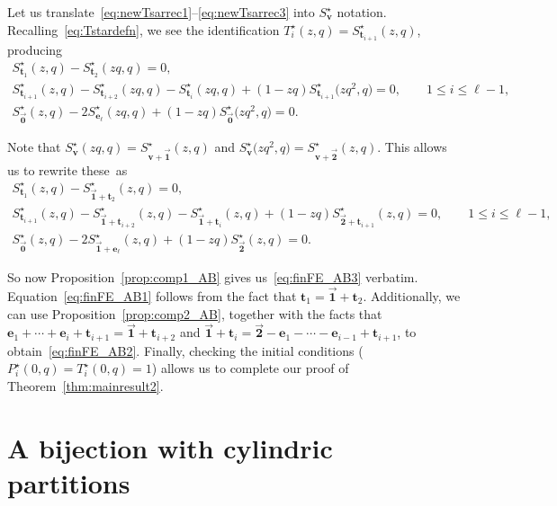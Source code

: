 \documentclass[pdftex]{sigma}
\numberwithin{equation}{section}
\theoremstyle{definition}
\newcommand{\tr}{\mathbf{t}}
\newcommand{\vv}{\mathbf{v}}
\newcommand{\ee}{\mathbf{e}}
\newcommand{\two}{\vec{\mathbf{2}}}
\newcommand{\one}{\vec{\mathbf{1}}}
\newcommand{\zero}{\vec{\mathbf{0}}}
\begin{document}
Let us translate~\eqref{eq:newTsarrec1}--\eqref{eq:newTsarrec3} into $S^\star_\vv$ notation. Recalling~\eqref{eq:Tstardefn}, we see the identification $T^\star_i(z,q) = S^\star_{\tr_{i+1}}(z,q)$, producing
\begin{gather*}
S^\star_{\tr_1}(z,q)-S^\star_{\tr_2}(zq,q) =0, \\
S^\star_{\tr_{i+1}}(z,q) - S^\star_{\tr_{i+2}}(zq,q) - S^\star_{\tr_{i}}(zq,q) + (1-zq)S^\star_{\tr_{i+1}}\bigl(zq^2,q\bigr) =0, \qquad 1 \le i \le \ell-1, \\
S^\star_{\zero}(z,q) -2S^\star_{\ee_\ell}(zq,q) + (1-zq) S^\star_{\zero}\bigl(zq^2,q\bigr) = 0.
\end{gather*}

Note that $S^\star_\vv(zq,q) = S^\star_{\vv+\one} (z,q)$ and $S^\star_\vv\bigl(zq^2,q\bigr) = S^\star_{\vv+\two} (z,q)$. This allows us to rewrite these~as
\begin{gather}
S^\star_{\tr_1}(z,q)-S^\star_{\one+\tr_2}(z,q) =0,\label{eq:finFE_AB1} \\
S^\star_{\tr_{i+1}}(z,q) - S^\star_{\one+\tr_{i+2}}(z,q) - S^\star_{\one+\tr_{i}}(z,q) + (1-zq)S^\star_{\two+\tr_{i+1}}(z,q) =0, \qquad\! 1 \le i \le \ell-1, \!\!\!\label{eq:finFE_AB2} \\
S^\star_{\zero}(z,q) - 2S^\star_{\one+\ee_\ell}(z,q) + (1-zq) S^\star_{\two}(z,q) = 0. \label{eq:finFE_AB3}
\end{gather}

So now Proposition~\ref{prop:comp1_AB} gives us~\eqref{eq:finFE_AB3} verbatim. Equation~\eqref{eq:finFE_AB1} follows from the fact that $\tr_1=\one+\tr_2$. Additionally, we can use Proposition~\ref{prop:comp2_AB}, together with the facts that $\ee_1+\cdots+\ee_{i}+\tr_{i+1} = \one+\tr_{i+2}$ and $\one+\tr_{i} =\two-\ee_1-\cdots-\ee_{i-1}+\tr_{i+1}$, to obtain~\eqref{eq:finFE_AB2}. Finally, checking the initial conditions ($P^\star_i(0,q)=T^\star_i(0,q)=1$) allows us to complete our proof of Theorem~\ref{thm:mainresult2}.

\section{A bijection with cylindric partitions}\label{sec:6}
\end{document}
